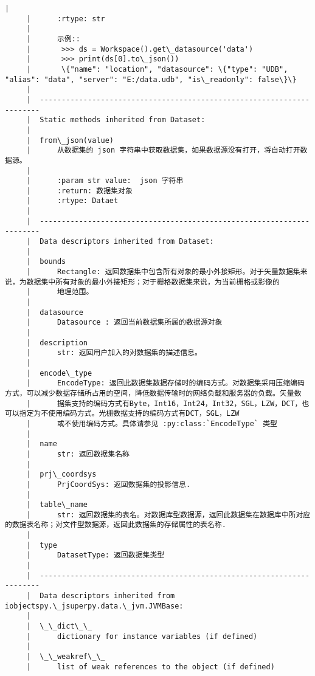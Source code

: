 \documentclass[11pt]{article}
\begin{document}
\begin{Verbatim}[commandchars=\\\{\}]
     |      
     |      :rtype: str
     |      
     |      示例::
     |       >>> ds = Workspace().get\_datasource('data')
     |       >>> print(ds[0].to\_json())
     |       \{"name": "location", "datasource": \{"type": "UDB", "alias": "data", "server": "E:/data.udb", "is\_readonly": false\}\}
     |  
     |  ----------------------------------------------------------------------
     |  Static methods inherited from Dataset:
     |  
     |  from\_json(value)
     |      从数据集的 json 字符串中获取数据集，如果数据源没有打开，将自动打开数据源。
     |      
     |      :param str value:  json 字符串
     |      :return: 数据集对象
     |      :rtype: Dataet
     |  
     |  ----------------------------------------------------------------------
     |  Data descriptors inherited from Dataset:
     |  
     |  bounds
     |      Rectangle: 返回数据集中包含所有对象的最小外接矩形。对于矢量数据集来说，为数据集中所有对象的最小外接矩形；对于栅格数据集来说，为当前栅格或影像的
     |      地理范围。
     |  
     |  datasource
     |      Datasource : 返回当前数据集所属的数据源对象
     |  
     |  description
     |      str: 返回用户加入的对数据集的描述信息。
     |  
     |  encode\_type
     |      EncodeType: 返回此数据集数据存储时的编码方式。对数据集采用压缩编码方式，可以减少数据存储所占用的空间，降低数据传输时的网络负载和服务器的负载。矢量数
     |      据集支持的编码方式有Byte，Int16，Int24，Int32，SGL，LZW，DCT，也可以指定为不使用编码方式。光栅数据支持的编码方式有DCT，SGL，LZW
     |      或不使用编码方式。具体请参见 :py:class:`EncodeType` 类型
     |  
     |  name
     |      str: 返回数据集名称
     |  
     |  prj\_coordsys
     |      PrjCoordSys: 返回数据集的投影信息.
     |  
     |  table\_name
     |      str: 返回数据集的表名。对数据库型数据源，返回此数据集在数据库中所对应的数据表名称；对文件型数据源，返回此数据集的存储属性的表名称.
     |  
     |  type
     |      DatasetType: 返回数据集类型
     |  
     |  ----------------------------------------------------------------------
     |  Data descriptors inherited from iobjectspy.\_jsuperpy.data.\_jvm.JVMBase:
     |  
     |  \_\_dict\_\_
     |      dictionary for instance variables (if defined)
     |  
     |  \_\_weakref\_\_
     |      list of weak references to the object (if defined)
    

\end{Verbatim}
\end{document}
